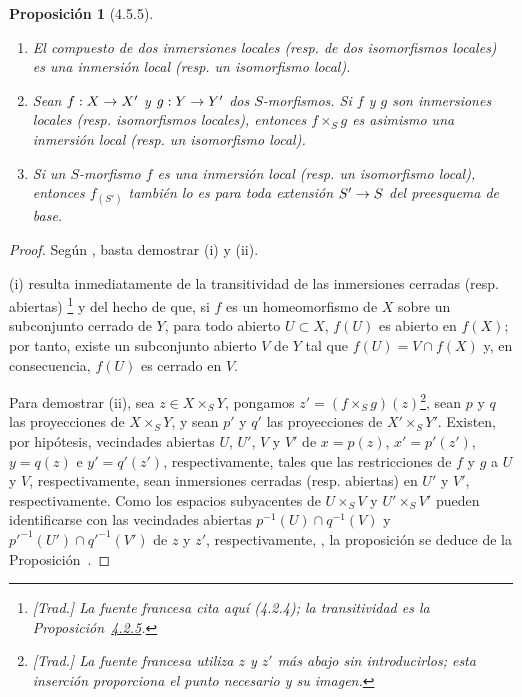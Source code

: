 \documentclass[oneside]{amsart}
\theoremstyle{ega-env-style}
\theoremstyle{ega-thm-env-style}
\newtheorem*{proposition}{Proposición}
\theoremstyle{ega-defn-env-style}
\renewcommand{\to}{\mathchoice{\longrightarrow}{\rightarrow}{\rightarrow}{\rightarrow}}
\let\EGAOriginalLabel\label
\renewcommand{\label}[1]{\phantomsection\EGAOriginalLabel{#1}}
\begin{document}
\begin{proposition}[4.5.5]
\label{I.4.5.5}
\medskip\noindent
\begin{enumerate}
  \item[{\rm(i)}] El compuesto de dos inmersiones locales (\textup{resp.} de dos isomorfismos locales) es una inmersión local (\textup{resp.} un isomorfismo local).
  \item[{\rm(ii)}] Sean $f:X\to X'$ y $g:Y\to Y'$ dos $S$-morfismos.
    Si $f$ y $g$ son inmersiones locales (\textup{resp.} isomorfismos locales), entonces $f\times_S g$ es asimismo una inmersión local (resp. un isomorfismo local).
  \item[{\rm(iii)}] Si un $S$-morfismo $f$ es una inmersión local (\textup{resp.} un isomorfismo local), entonces $f_{(S')}$ también lo es para toda extensión $S'\to S$ del preesquema de base.
\end{enumerate}
\end{proposition}

\begin{proof}
Según , basta demostrar (i) y (ii).

(i) resulta inmediatamente de la transitividad de las inmersiones cerradas (resp. abiertas) \footnote{\emph{[Trad.] La fuente francesa cita aquí (4.2.4); la transitividad es la Proposición~\hyperref[I.4.2.5]{4.2.5}.}} y del hecho de que, si $f$ es un homeomorfismo de $X$ sobre un subconjunto cerrado de $Y$, para todo abierto $U\subset X$, $f(U)$ es abierto en $f(X)$; por tanto, existe un subconjunto abierto $V$ de $Y$ tal que $f(U)=V\cap f(X)$ y, en consecuencia, $f(U)$ es cerrado en $V$.

Para demostrar (ii), sea $z\in X\times_S Y$, pongamos $z'=(f\times_S g)(z)$\footnote{\emph{[Trad.] La fuente francesa utiliza $z$ y $z'$ más abajo sin introducirlos; esta inserción proporciona el punto necesario y su imagen.}}, sean $p$ y $q$ las proyecciones de $X\times_S Y$, y sean $p'$ y $q'$ las proyecciones de $X'\times_S Y'$.
Existen, por hipótesis, vecindades abiertas $U$, $U'$, $V$ y $V'$ de $x=p(z)$, $x'=p'(z')$, $y=q(z)$ e $y'=q'(z')$, respectivamente, tales que las restricciones de $f$ y $g$ a $U$ y $V$, respectivamente, sean inmersiones cerradas (resp. abiertas) en $U'$ y $V'$, respectivamente.
Como los espacios subyacentes de $U\times_S V$ y $U'\times_S V'$ pueden identificarse con las vecindades abiertas $p^{-1}(U)\cap q^{-1}(V)$ y ${p'}^{-1}(U')\cap{q'}^{-1}(V')$ de $z$ y $z'$, respectivamente, , la proposición se deduce de la Proposición~.
\end{proof}
\end{document}
